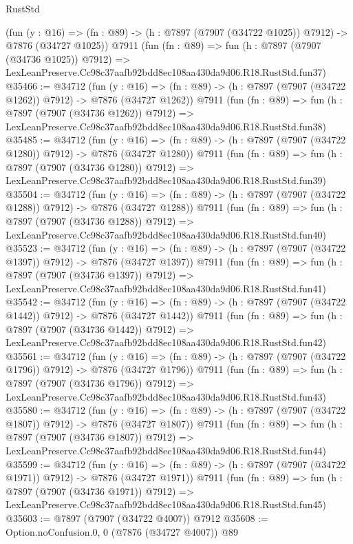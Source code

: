 \begin{lexlean}{RustStd}
\begin{coremodule}
    (fun (y : @16) =>
    (fn : @89) -> (h : @7897 (@7907 (@34722 @1025)) @7912) -> @7876 (@34727 @1025))
    @7911
    (fun (fn : @89) =>
    fun (h : @7897 (@7907 (@34736 @1025)) @7912) =>
    LexLeanPreserve.Cc98c37aafb92bdd8ec108aa430da9d06.R18.RustStd.fun37)
@35466 := @34712
    (fun (y : @16) =>
    (fn : @89) -> (h : @7897 (@7907 (@34722 @1262)) @7912) -> @7876 (@34727 @1262))
    @7911
    (fun (fn : @89) =>
    fun (h : @7897 (@7907 (@34736 @1262)) @7912) =>
    LexLeanPreserve.Cc98c37aafb92bdd8ec108aa430da9d06.R18.RustStd.fun38)
@35485 := @34712
    (fun (y : @16) =>
    (fn : @89) -> (h : @7897 (@7907 (@34722 @1280)) @7912) -> @7876 (@34727 @1280))
    @7911
    (fun (fn : @89) =>
    fun (h : @7897 (@7907 (@34736 @1280)) @7912) =>
    LexLeanPreserve.Cc98c37aafb92bdd8ec108aa430da9d06.R18.RustStd.fun39)
@35504 := @34712
    (fun (y : @16) =>
    (fn : @89) -> (h : @7897 (@7907 (@34722 @1288)) @7912) -> @7876 (@34727 @1288))
    @7911
    (fun (fn : @89) =>
    fun (h : @7897 (@7907 (@34736 @1288)) @7912) =>
    LexLeanPreserve.Cc98c37aafb92bdd8ec108aa430da9d06.R18.RustStd.fun40)
@35523 := @34712
    (fun (y : @16) =>
    (fn : @89) -> (h : @7897 (@7907 (@34722 @1397)) @7912) -> @7876 (@34727 @1397))
    @7911
    (fun (fn : @89) =>
    fun (h : @7897 (@7907 (@34736 @1397)) @7912) =>
    LexLeanPreserve.Cc98c37aafb92bdd8ec108aa430da9d06.R18.RustStd.fun41)
@35542 := @34712
    (fun (y : @16) =>
    (fn : @89) -> (h : @7897 (@7907 (@34722 @1442)) @7912) -> @7876 (@34727 @1442))
    @7911
    (fun (fn : @89) =>
    fun (h : @7897 (@7907 (@34736 @1442)) @7912) =>
    LexLeanPreserve.Cc98c37aafb92bdd8ec108aa430da9d06.R18.RustStd.fun42)
@35561 := @34712
    (fun (y : @16) =>
    (fn : @89) -> (h : @7897 (@7907 (@34722 @1796)) @7912) -> @7876 (@34727 @1796))
    @7911
    (fun (fn : @89) =>
    fun (h : @7897 (@7907 (@34736 @1796)) @7912) =>
    LexLeanPreserve.Cc98c37aafb92bdd8ec108aa430da9d06.R18.RustStd.fun43)
@35580 := @34712
    (fun (y : @16) =>
    (fn : @89) -> (h : @7897 (@7907 (@34722 @1807)) @7912) -> @7876 (@34727 @1807))
    @7911
    (fun (fn : @89) =>
    fun (h : @7897 (@7907 (@34736 @1807)) @7912) =>
    LexLeanPreserve.Cc98c37aafb92bdd8ec108aa430da9d06.R18.RustStd.fun44)
@35599 := @34712
    (fun (y : @16) =>
    (fn : @89) -> (h : @7897 (@7907 (@34722 @1971)) @7912) -> @7876 (@34727 @1971))
    @7911
    (fun (fn : @89) =>
    fun (h : @7897 (@7907 (@34736 @1971)) @7912) =>
    LexLeanPreserve.Cc98c37aafb92bdd8ec108aa430da9d06.R18.RustStd.fun45)
@35603 := @7897 (@7907 (@34722 @4007)) @7912
@35608 := Option.noConfusion.{0, 0} (@7876 (@34727 @4007)) @89

\end{coremodule}
\end{lexlean}
